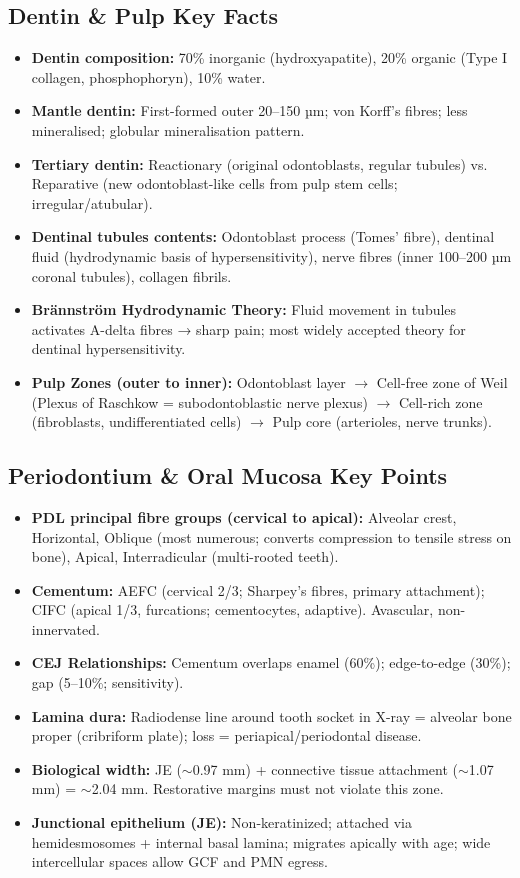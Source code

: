 \documentclass[11pt,a4paper]{article}
\begin{document}
\subsection{Dentin \& Pulp Key Facts}
\begin{itemize}[leftmargin=*]
    \item \textbf{Dentin composition:} 70\% inorganic (hydroxyapatite), 20\% organic (Type I collagen, phosphophoryn), 10\% water.
    \item \textbf{Mantle dentin:} First-formed outer 20--150 µm; von Korff's fibres; less mineralised; globular mineralisation pattern.
    \item \textbf{Tertiary dentin:} Reactionary (original odontoblasts, regular tubules) vs. Reparative (new odontoblast-like cells from pulp stem cells; irregular/atubular).
    \item \textbf{Dentinal tubules contents:} Odontoblast process (Tomes' fibre), dentinal fluid (hydrodynamic basis of hypersensitivity), nerve fibres (inner 100--200 µm coronal tubules), collagen fibrils.
    \item \textbf{Brännström Hydrodynamic Theory:} Fluid movement in tubules activates A-delta fibres → sharp pain; most widely accepted theory for dentinal hypersensitivity.
    \item \textbf{Pulp Zones (outer to inner):} Odontoblast layer $\rightarrow$ Cell-free zone of Weil (Plexus of Raschkow = subodontoblastic nerve plexus) $\rightarrow$ Cell-rich zone (fibroblasts, undifferentiated cells) $\rightarrow$ Pulp core (arterioles, nerve trunks).
\end{itemize}

\subsection{Periodontium \& Oral Mucosa Key Points}
\begin{itemize}[leftmargin=*]
    \item \textbf{PDL principal fibre groups (cervical to apical):} Alveolar crest, Horizontal, Oblique (most numerous; converts compression to tensile stress on bone), Apical, Interradicular (multi-rooted teeth).
    \item \textbf{Cementum:} AEFC (cervical 2/3; Sharpey's fibres, primary attachment); CIFC (apical 1/3, furcations; cementocytes, adaptive). Avascular, non-innervated.
    \item \textbf{CEJ Relationships:} Cementum overlaps enamel (60\%); edge-to-edge (30\%); gap (5--10\%; sensitivity).
    \item \textbf{Lamina dura:} Radiodense line around tooth socket in X-ray = alveolar bone proper (cribriform plate); loss = periapical/periodontal disease.
    \item \textbf{Biological width:} JE ($\sim$0.97 mm) + connective tissue attachment ($\sim$1.07 mm) = $\sim$2.04 mm. Restorative margins must not violate this zone.
    \item \textbf{Junctional epithelium (JE):} Non-keratinized; attached via hemidesmosomes + internal basal lamina; migrates apically with age; wide intercellular spaces allow GCF and PMN egress.
\end{itemize}
\end{document}
